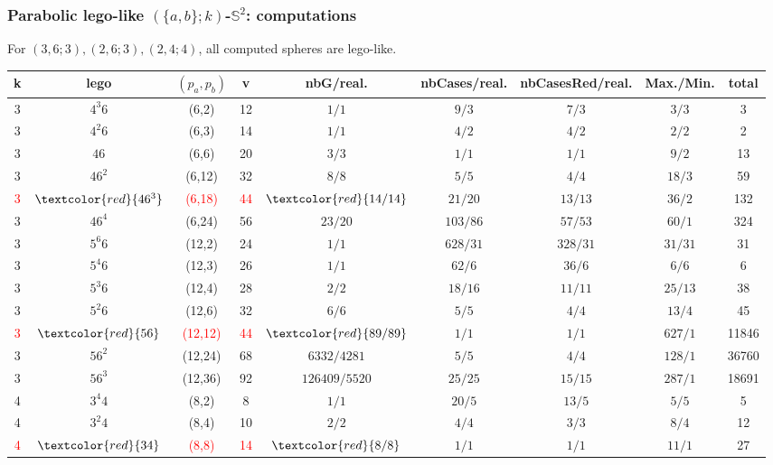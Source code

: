 \documentclass{beamer}
\begin{document}
\begin{frame}\frametitle{Parabolic lego-like   $(\{a,b\}; k)$-$\mathbb{S}^2$: computations}
\vspace{-4mm}
\begin{center}
\tiny
For 
 $(3,6;3),(2,6;3),(2,4;4)$, all computed 
 spheres 
are lego-like.
\begin{tabular}{||c|c|c|c|c|c|c|c|c||}
\hline \hline
k & lego & $(p_a, p_b)$ & v & nbG/real. & nbCases/real. & nbCasesRed/real. & Max./Min. & total\\
\hline
3 & $4^{3}6$ & (6,2) & 12 & $1/1$ & $9/3$ & $7/3$ & $3/3$ & 3\\
3 & $4^{2}6$ & (6,3) & 14 & $1/1$ & $4/2$ & $4/2$ & $2/2$ & 2\\
3 & $46$ & (6,6) & 20 & $3/3$ & $1/1$ & $1/1$ & $9/2$ & 13\\
3 & $46^{2}$ & (6,12) & 32 & $8/8$ & $5/5$ & $4/4$ & $18/3$ & 59\\
\textcolor{red}{3} & $\textcolor{red}{46^{3}}$ &\textcolor{red}{(6,18)} &\textcolor{red}{ 44} & $ \textcolor{red}{ 14/14}$ &
 $21/20$ & $13/13$ & $36/2$ & 132\\
3 & $46^{4}$ & (6,24) & 56 & $23/20$ & $103/86$ & $57/53$ & $60/1$ & 324\\
\hline
3 & $5^{6}6$ & (12,2) & 24 & $1/1$ & $628/31$ & $328/31$ & $31/31$ & 31\\
3 & $5^{4}6$ & (12,3) & 26 & $1/1$ & $62/6$ & $36/6$ & $6/6$ & 6\\
3 & $5^{3}6$ & (12,4) & 28 & $2/2$ & $18/16$ & $11/11$ & $25/13$ & 38\\
3 & $5^{2}6$ & (12,6) & 32 & $6/6$ & $5/5$ & $4/4$ & $13/4$ & 45\\
\textcolor{red}{3} & $\textcolor{red}{56}$ &\textcolor{red}{(12,12)} & \textcolor{red}{44} & $\textcolor{red}{89/89}$ & $1/1$ & $1/1$ & $627/1$ & 11846\\
3 & $56^{2}$ & (12,24) & 68 & $6332/4281$ & $5/5$ & $4/4$ & $128/1$ & 36760\\
3 & $56^{3}$ & (12,36) & 92 & $126409/5520$ & $25/25$ & $15/15$ & $287/1$ & 18691\\
\hline
4 & $3^{4}4$ & (8,2) & 8 & $1/1$ & $20/5$ & $13/5$ & $5/5$ & 5\\
4 & $3^{2}4$ & (8,4) & 10 & $2/2$ & $4/4$ & $3/3$ & $8/4$ & 12\\
\textcolor{red}{4} & $\textcolor{red}{34}$ & \textcolor{red}{(8,8)} & \textcolor{red}{14} & $\textcolor{red}{8/8}$ & $1/1$ & $1/1$ & $11/1$ & 27\\

\end{tabular}
\end{center}
\end{frame}
\end{document}
